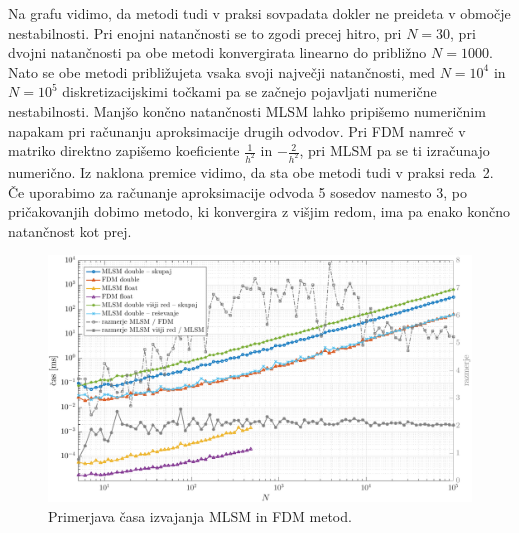 \documentclass[12pt,a4paper,twoside]{article}
\theoremstyle{definition} %
\theoremstyle{plain} %
\numberwithin{equation}{section}
\newlength{\iw}
\begin{document}
Na grafu vidimo, da metodi tudi v praksi sovpadata dokler ne preideta v območje
nestabilnosti. Pri enojni natančnosti se to zgodi precej hitro, pri $N = 30$,
pri dvojni natančnosti pa obe metodi konvergirata linearno do približno $N = 1000$.
Nato se obe metodi približujeta vsaka svoji največji natančnosti,
med $N = 10^4$ in $N = 10^5$ diskretizacijskimi točkami pa se začnejo pojavljati
numerične nestabilnosti. Manjšo končno natančnosti MLSM lahko pripišemo
numeričnim napakam pri računanju aproksimacije drugih odvodov. Pri FDM namreč v
matriko direktno zapišemo koeficiente $\frac{1}{h^2}$ in $-\frac{2}{h^2}$, pri
MLSM pa se ti izračunajo numerično. Iz naklona premice vidimo, da sta obe metodi
tudi v praksi reda~2. Če uporabimo za računanje aproksimacije odvoda 5 sosedov
namesto 3, po pričakovanjih dobimo metodo, ki konvergira z višjim redom, ima pa
enako končno natančnost kot prej.

\begin{figure}[h]
  \centering
  \includegraphics[width=\iw]{images/lap1d_times.pdf}
  \caption{Primerjava časa izvajanja MLSM in FDM metod.}
  \label{fig:mlsm-fdm-time}
\end{figure}
\end{document}

